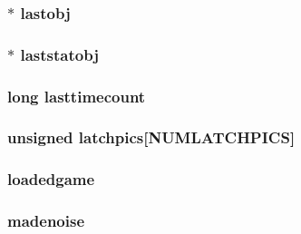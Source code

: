 \label{WL__DEF_8H_a21442011799a426226eec3654541de23}
\hypertarget{WL__DEF_8H_afcd8a7c0f5c40f4a956efc9b5c0f7eb7}{
\subsubsection[{lastobj}]{ $\ast$ {\bf lastobj}}}
\label{WL__DEF_8H_afcd8a7c0f5c40f4a956efc9b5c0f7eb7}
\hypertarget{WL__DEF_8H_a6797183a5cacdaf405abbbcb02881132}{
\subsubsection[{laststatobj}]{ $\ast$ {\bf laststatobj}}}
\label{WL__DEF_8H_a6797183a5cacdaf405abbbcb02881132}
\hypertarget{WL__DEF_8H_a9833356b947444f0974c777f47e6ce42}{
\subsubsection[{lasttimecount}]{\setlength{\rightskip}{0pt plus 5cm}long {\bf lasttimecount}}}
\label{WL__DEF_8H_a9833356b947444f0974c777f47e6ce42}
\hypertarget{WL__DEF_8H_adbe64e9f4cdaee2e69ce2b915bd5c9ff}{
\subsubsection[{latchpics}]{\setlength{\rightskip}{0pt plus 5cm}unsigned {\bf latchpics}\mbox{[}NUMLATCHPICS\mbox{]}}}
\label{WL__DEF_8H_adbe64e9f4cdaee2e69ce2b915bd5c9ff}
\hypertarget{WL__DEF_8H_a2361eb57d882933d300f22fae83e8fa0}{
\subsubsection[{loadedgame}]{ {\bf loadedgame}}}
\label{WL__DEF_8H_a2361eb57d882933d300f22fae83e8fa0}
\hypertarget{WL__DEF_8H_a4971e2bca2f2589e2a6a70d6d6c54caa}{
\subsubsection[{madenoise}]{ {\bf madenoise}}}
